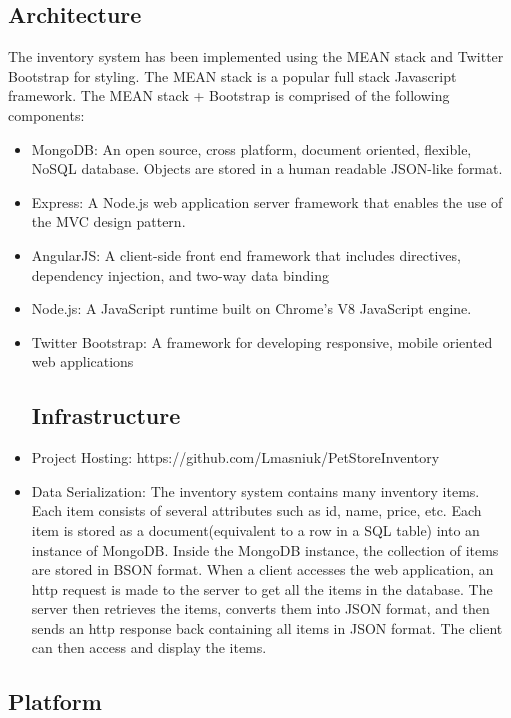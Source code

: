 \documentclass[letterpaper, 12pt]{article}
\begin{document}
\subsection{Architecture}
\noindent The inventory system has been implemented using the MEAN stack and Twitter Bootstrap for styling. The MEAN stack is a popular full stack Javascript framework. The MEAN stack + Bootstrap is comprised of the following components:
\begin{itemize}
\item MongoDB: An open source, cross platform, document oriented, flexible, NoSQL database. Objects are stored in a human readable JSON-like format.
\item Express: A Node.js web application server framework that enables the use of the MVC design pattern.
\item AngularJS: A client-side front end framework that includes directives, dependency injection, and two-way data binding
\item Node.js: A JavaScript runtime built on Chrome's V8 JavaScript engine.
\item Twitter Bootstrap: A framework for developing responsive, mobile oriented web applications

\subsection{Infrastructure}

\item Project Hosting:
 https://github.com/Lmasniuk/PetStoreInventory


\item Data Serialization:
The inventory system contains many inventory items. Each item consists of several attributes such as id, name, price, etc. Each item is stored as a document(equivalent to a row in a SQL table) into an instance of MongoDB. Inside the MongoDB instance, the collection of items are stored in BSON format. When a client accesses the web application, an http request is made to the server to get all the items in the database. The server then retrieves the items, converts them into JSON format, and then sends an http response back containing all items in JSON format. The client can then access and display the items. 
\end{itemize}

\subsection{Platform}
\end{document}
